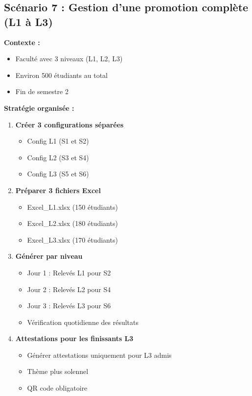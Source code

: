 \subsection{Scénario 7 : Gestion d'une promotion complète (L1 à L3)}

\textbf{Contexte :}
\begin{itemize}[leftmargin=*]
    \item Faculté avec 3 niveaux (L1, L2, L3)
    \item Environ 500 étudiants au total
    \item Fin de semestre 2
\end{itemize}

\textbf{Stratégie organisée :}

\begin{enumerate}[leftmargin=*]
    \item \textbf{Créer 3 configurations séparées}
    \begin{itemize}
        \item Config L1 (S1 et S2)
        \item Config L2 (S3 et S4)
        \item Config L3 (S5 et S6)
    \end{itemize}

    \item \textbf{Préparer 3 fichiers Excel}
    \begin{itemize}
        \item Excel\_L1.xlsx (150 étudiants)
        \item Excel\_L2.xlsx (180 étudiants)
        \item Excel\_L3.xlsx (170 étudiants)
    \end{itemize}

    \item \textbf{Générer par niveau}
    \begin{itemize}
        \item Jour 1 : Relevés L1 pour S2
        \item Jour 2 : Relevés L2 pour S4
        \item Jour 3 : Relevés L3 pour S6
        \item Vérification quotidienne des résultats
    \end{itemize}

    \item \textbf{Attestations pour les finissants L3}
    \begin{itemize}
        \item Générer attestations uniquement pour L3 admis
        \item Thème plus solennel
        \item QR code obligatoire
    \end{itemize}
\end{enumerate}

